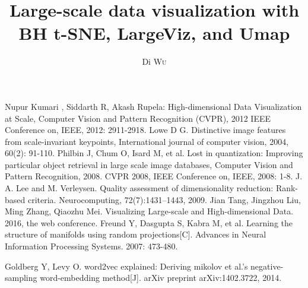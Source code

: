 \documentclass{EPL-master-thesis-covers-EN}
\title{Large-scale data visualization with BH t-SNE, LargeViz, and Umap}
\author{Di \textsc{Wu}}
\begin{document}
  \maketitle
  
\thispagestyle{empty}		%



\listoftodos

\tableofcontents
\newpage


% 





\begin{thebibliography}{99}  
Nupur Kumari , Siddarth R, Akash Rupela: High-dimensional Data Visualization at Scale, Computer Vision and Pattern Recognition (CVPR), 2012 IEEE Conference on, IEEE, 2012: 2911-2918.  
Lowe D G. Distinctive image features from scale-invariant keypoints, International journal of computer vision, 2004, 60(2): 91-110.  
Philbin J, Chum O, Isard M, et al. Lost in quantization: Improving particular object retrieval in large scale image databases, Computer Vision and Pattern Recognition, 2008. CVPR 2008, IEEE Conference on, IEEE, 2008: 1-8.
J. A. Lee and M. Verleysen. Quality assessment of dimensionality reduction: Rank-based criteria. Neurocomputing, 72(7):1431–1443, 2009.
Jian Tang, Jingzhou Liu, Ming Zhang, Qiaozhu Mei. Visualizing Large-scale and High-dimensional Data. 2016, the web conference.
Freund Y, Dasgupta S, Kabra M, et al. Learning the structure of manifolds using random projections[C]. Advances in Neural Information Processing Systems. 2007: 473-480.

Goldberg Y, Levy O. word2vec explained: Deriving mikolov et al.’s negative-sampling word-embedding method[J]. arXiv preprint arXiv:1402.3722, 2014.

\end{thebibliography}

  \backcoverpage
\end{document}
